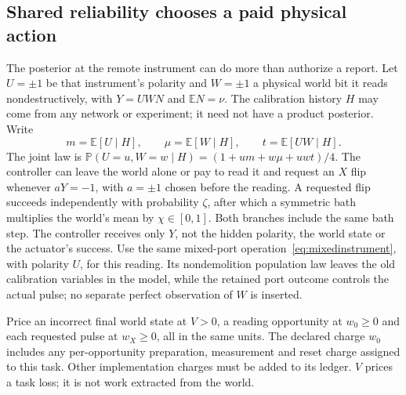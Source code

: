 \documentclass[11pt,a4paper]{article}
\newcommand{\E}{\mathbb E}
\newcommand{\Pp}{\mathbb P}
\begin{document}
\subsection{Shared reliability chooses a paid physical action}\label{subsec:priced}

The posterior at the remote instrument can do more than authorize a report. Let $U=\pm1$ be that instrument's polarity and $W=\pm1$ a physical world bit it reads nondestructively, with $Y=UWN$ and $\E N=\nu$. The calibration history $H$ may come from any network or experiment; it need not have a product posterior. Write
\[
 m=\E[U\mid H],\qquad \mu=\E[W\mid H],\qquad t=\E[UW\mid H].
\]
The joint law is $\Pp(U=u,W=w\mid H)=(1+um+w\mu+uwt)/4$. The controller can leave the world alone or pay to read it and request an $X$ flip whenever $aY=-1$, with $a=\pm1$ chosen before the reading. A requested flip succeeds independently with probability $\zeta$, after which a symmetric bath multiplies the world's mean by $\chi\in[0,1]$. Both branches include the same bath step. The controller receives only $Y$, not the hidden polarity, the world state or the actuator's success. Use the same mixed-port operation~\eqref{eq:mixedinstrument}, with polarity $U$, for this reading. Its nondemolition population law leaves the old calibration variables in the model, while the retained port outcome controls the actual pulse; no separate perfect observation of $W$ is inserted.

Price an incorrect final world state at $V>0$, a reading opportunity at $w_0\ge0$ and each requested pulse at $w_X\ge0$, all in the same units. The declared charge $w_0$ includes any per-opportunity preparation, measurement and reset charge assigned to this task. Other implementation charges must be added to its ledger. $V$ prices a task loss; it is not work extracted from the world.
\end{document}
